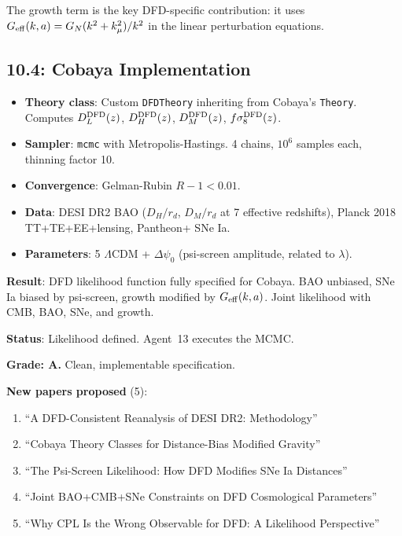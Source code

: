 \documentclass[11pt,a4paper]{article}
\begin{document}
The growth term is the key DFD-specific contribution: it uses $G_{\rm eff}(k,a) = G_N(k^2 + k_\mu^2)/k^2$ in the linear perturbation equations.

\subsection{10.4: Cobaya Implementation}

\begin{itemize}
\item \textbf{Theory class}: Custom \texttt{DFDTheory} inheriting from Cobaya's \texttt{Theory}. Computes $D_L^{\rm DFD}(z)$, $D_H^{\rm DFD}(z)$, $D_M^{\rm DFD}(z)$, $f\sigma_8^{\rm DFD}(z)$.
\item \textbf{Sampler}: \texttt{mcmc} with Metropolis-Hastings. 4 chains, $10^6$ samples each, thinning factor 10.
\item \textbf{Convergence}: Gelman-Rubin $R - 1 < 0.01$.
\item \textbf{Data}: DESI DR2 BAO ($D_H/r_d$, $D_M/r_d$ at 7 effective redshifts), Planck 2018 TT+TE+EE+lensing, Pantheon+ SNe Ia.
\item \textbf{Parameters}: 5 $\Lambda$CDM + $\Delta\psi_0$ (psi-screen amplitude, related to $\lambda$).
\end{itemize}

\begin{tcolorbox}[colback=green!5!white, colframe=green!60!black, title={Agent 10: DESI Phase 2 Likelihood DEFINED}]
\textbf{Result}: DFD likelihood function fully specified for Cobaya. BAO unbiased, SNe Ia biased by psi-screen, growth modified by $G_{\rm eff}(k,a)$. Joint likelihood with CMB, BAO, SNe, and growth.

\textbf{Status}: Likelihood defined. Agent~13 executes the MCMC.

\textbf{Grade: A.} Clean, implementable specification.

\textbf{New papers proposed} (5):
\begin{enumerate}
\item ``A DFD-Consistent Reanalysis of DESI DR2: Methodology''
\item ``Cobaya Theory Classes for Distance-Bias Modified Gravity''
\item ``The Psi-Screen Likelihood: How DFD Modifies SNe Ia Distances''
\item ``Joint BAO+CMB+SNe Constraints on DFD Cosmological Parameters''
\item ``Why CPL Is the Wrong Observable for DFD: A Likelihood Perspective''
\end{enumerate}
\end{tcolorbox}
\end{document}
